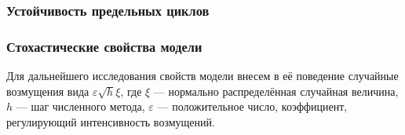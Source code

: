 \documentclass[slidestop,compress,mathserif]{beamer}
\begin{document}
\begin{frame}
\frametitle{Устойчивость предельных циклов}
\begin{figure}[h!]
\vspace{-1em}
\vspace{-2em}
\end{figure}
\end{frame}
\begin{frame}
\frametitle{Стохастические свойства модели}
\vspace{4em}
Для дальнейшего исследования свойств модели внесем в её поведение случайные возмущения вида $\varepsilon  \sqrt{h} \xi$, где $\xi$ --- нормально распределённая случайная величина, $h$ --- шаг численного метода, $\varepsilon$ --- положительное число, коэффициент, регулирующий интенсивность возмущений.
\end{frame}
\end{document}
